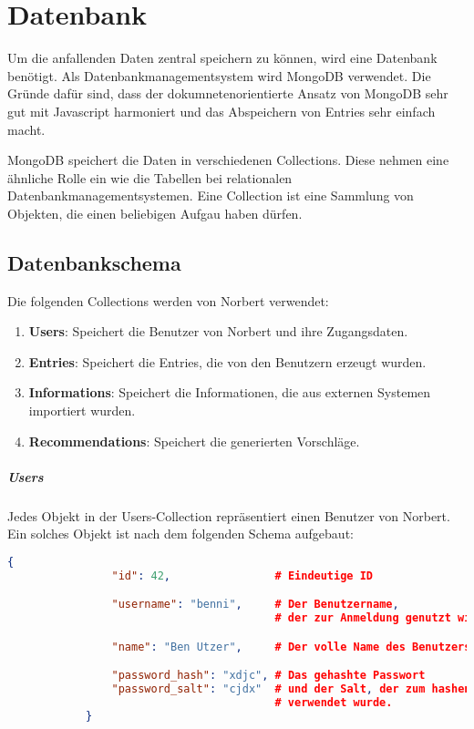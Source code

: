 
\chapter{Datenbank}

Um die anfallenden Daten zentral speichern zu können, wird eine Datenbank benötigt. Als Datenbankmanagementsystem wird MongoDB verwendet. Die Gründe dafür sind, dass der dokumnetenorientierte Ansatz von MongoDB sehr gut mit Javascript harmoniert und das Abspeichern von Entries sehr einfach macht.

MongoDB speichert die Daten in verschiedenen Collections. Diese nehmen eine ähnliche Rolle ein wie die Tabellen bei relationalen Datenbankmanagementsystemen. Eine Collection ist eine Sammlung von Objekten, die einen beliebigen Aufgau haben dürfen.

\section{Datenbankschema} %
\label{sec:datenbankschema}

	Die folgenden Collections werden von Norbert verwendet:

	\begin{enumerate}
		\item \textbf{Users}: Speichert die Benutzer von Norbert und ihre Zugangsdaten.
		\item \textbf{Entries}: Speichert die Entries, die von den Benutzern erzeugt wurden.
		\item \textbf{Informations}: Speichert die Informationen, die aus externen Systemen importiert wurden.
		\item \textbf{Recommendations}: Speichert die generierten Vorschläge.
	\end{enumerate}

	\paragraph{Users} %
	\label{par:users}

		Jedes Objekt in der Users-Collection repräsentiert einen Benutzer von Norbert. Ein solches Objekt ist nach dem folgenden Schema aufgebaut:

		\begin{lstlisting}[language=JSON]
			{
				"id": 42,                # Eindeutige ID

				"username": "benni",     # Der Benutzername, 
				                         # der zur Anmeldung genutzt wird.

				"name": "Ben Utzer",     # Der volle Name des Benutzers

				"password_hash": "xdjc", # Das gehashte Passwort
				"password_salt": "cjdx"  # und der Salt, der zum hashen des Passworts 
				                         # verwendet wurde.
			}
		\end{lstlisting}
